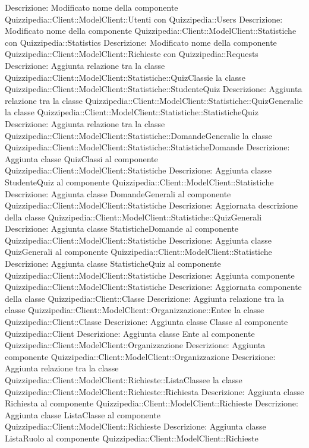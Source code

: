 Descrizione: Modificato nome della componente Quizzipedia::Client::ModelClient::Utenti con Quizzipedia::Users 
Descrizione: Modificato nome della componente Quizzipedia::Client::ModelClient::Statistiche con Quizzipedia::Statistics 
Descrizione: Modificato nome della componente Quizzipedia::Client::ModelClient::Richieste con Quizzipedia::Requests 
Descrizione: Aggiunta relazione tra la classe Quizzipedia::Client::ModelClient::Statistiche::QuizClassie la classe Quizzipedia::Client::ModelClient::Statistiche::StudenteQuiz 
Descrizione: Aggiunta relazione tra la classe Quizzipedia::Client::ModelClient::Statistiche::QuizGeneralie la classe Quizzipedia::Client::ModelClient::Statistiche::StatisticheQuiz 
Descrizione: Aggiunta relazione tra la classe Quizzipedia::Client::ModelClient::Statistiche::DomandeGeneralie la classe Quizzipedia::Client::ModelClient::Statistiche::StatisticheDomande 
Descrizione: Aggiunta classe QuizClassi al componente Quizzipedia::Client::ModelClient::Statistiche 
Descrizione: Aggiunta classe StudenteQuiz al componente Quizzipedia::Client::ModelClient::Statistiche 
Descrizione: Aggiunta classe DomandeGenerali al componente Quizzipedia::Client::ModelClient::Statistiche 
Descrizione: Aggiornata descrizione della classe Quizzipedia::Client::ModelClient::Statistiche::QuizGenerali 
Descrizione: Aggiunta classe StatisticheDomande al componente Quizzipedia::Client::ModelClient::Statistiche 
Descrizione: Aggiunta classe QuizGenerali al componente Quizzipedia::Client::ModelClient::Statistiche 
Descrizione: Aggiunta classe StatisticheQuiz al componente Quizzipedia::Client::ModelClient::Statistiche 
Descrizione: Aggiunta componente Quizzipedia::Client::ModelClient::Statistiche 
Descrizione: Aggiornata componente della classe Quizzipedia::Client::Classe 
Descrizione: Aggiunta relazione tra la classe Quizzipedia::Client::ModelClient::Organizzazione::Entee la classe Quizzipedia::Client::Classe 
Descrizione: Aggiunta classe Classe al componente Quizzipedia::Client 
Descrizione: Aggiunta classe Ente al componente Quizzipedia::Client::ModelClient::Organizzazione 
Descrizione: Aggiunta componente Quizzipedia::Client::ModelClient::Organizzazione 
Descrizione: Aggiunta relazione tra la classe Quizzipedia::Client::ModelClient::Richieste::ListaClassee la classe Quizzipedia::Client::ModelClient::Richieste::Richiesta 
Descrizione: Aggiunta classe Richiesta al componente Quizzipedia::Client::ModelClient::Richieste 
Descrizione: Aggiunta classe ListaClasse al componente Quizzipedia::Client::ModelClient::Richieste 
Descrizione: Aggiunta classe ListaRuolo al componente Quizzipedia::Client::ModelClient::Richieste 
